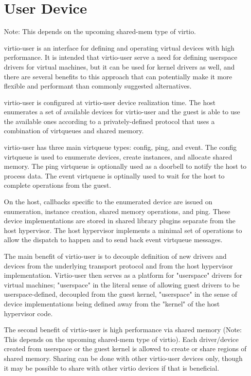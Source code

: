 \section{User Device}\label{sec:Device Types / User Device}

Note: This depends on the upcoming shared-mem type of virtio.

virtio-user is an interface for defining and operating virtual devices
with high performance.
It is intended that virtio-user serve a need for defining userspace drivers
for virtual machines, but it can be used for kernel drivers as well,
and there are several benefits to this approach that can potentially
make it more flexible and performant than commonly suggested alternatives.

virtio-user is configured at virtio-user device realization time.
The host enumerates a set of available devices for virtio-user
and the guest is able to use the available ones
according to a privately-defined protocol
that uses a combination of virtqueues and shared memory.

virtio-user has three main virtqueue types: config, ping, and event.
The config virtqueue is used to enumerate devices, create instances, and allocate shared memory.
The ping virtqueue is optionally used as a doorbell to notify the host to process data.
The event virtqueue is optinally used to wait for the host to complete operations
from the guest.

On the host, callbacks specific to the enumerated device are issued
on enumeration, instance creation, shared memory operations, and ping.
These device implementations are stored in shared library plugins
separate from the host hypervisor.
The host hypervisor implements a minimal set of operations to allow
the dispatch to happen and to send back event virtqueue messages.

The main benefit of virtio-user is
to decouple definition of new drivers and devices
from the underlying transport protocol
and from the host hypervisor implementation.
Virtio-user then serves as
a platform for "userspace" drivers for virtual machines;
"userspace" in the literal sense of allowing guest drivers
to be userspace-defined, decoupled from the guest kernel,
"userspace" in the sense of device implementations
being defined away from the "kernel" of the host hypervisor code.

The second benefit of virtio-user is high performance via shared memory
(Note: This depends on the upcoming shared-mem type of virtio).
Each driver/device created from userspace or the guest kernel
is allowed to create or share regions of shared memory.
Sharing can be done with other virtio-user devices only,
though it may be possible to share with other virtio devices if that is beneficial.

